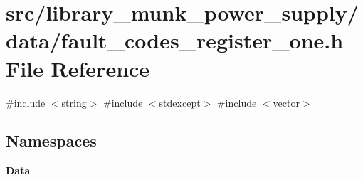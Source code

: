 \section{src/library\+\_\+munk\+\_\+power\+\_\+supply/data/fault\+\_\+codes\+\_\+register\+\_\+one.h File Reference}
\label{fault__codes__register__one_8h}
{\ttfamily \#include $<$string$>$}\newline
{\ttfamily \#include $<$stdexcept$>$}\newline
{\ttfamily \#include $<$vector$>$}\newline
\subsection*{Namespaces}
\begin{DoxyCompactItemize}
\item 
 \textbf{ Data}
\end{DoxyCompactItemize}

